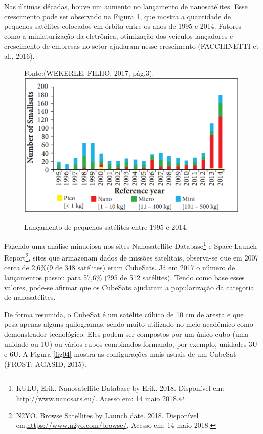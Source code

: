Nas últimas décadas, houve um aumento no lançamento de nanosatélites. Esse crescimento pode ser observado na Figura \ref{fig03}, que mostra a quantidade de pequenos satélites colocados em órbita entre os anos de 1995 e 2014. Fatores como a miniaturização da eletrônica, otimização dos veículos lançadores e crescimento de empresas no setor ajudaram nesse crescimento (FACCHINETTI et al., 2016).

{\small
	\begin{figure}[h]
		\centering
		Fonte:(WEKERLE; FILHO, 2017, pág.3).
		\includegraphics[keepaspectratio=true,scale=0.55]{figuras/lancamentoPequenoSatellite.PNG}
		\caption{Lançamento de pequenos satélites entre 1995 e 2014.}
		\label{fig03}
	\end{figure}
}

Fazendo uma análise minuciosa nos sites Nanosatellite Database\footnote{ KULU, Erik. Nanosatellite Database by Erik. 2018. Disponível em: \url{http://www.nanosats.eu/}. Acesso em: 14 maio 2018.} e Space Launch Report\footnote{N2YO. Browse Satellites by Launch date. 2018. Disponível em:\url{https://www.n2yo.com/browse/}.  Acesso em: 14 maio 2018.}, sites que armazenam dados de missões satelitais, observa-se que em 2007 cerca de 2,6\%(9 de 348 satélites) eram CubeSats. Já em 2017 o número de lançamentos passou para 57,6\% (295 de 512 satélites). Tendo como base esses valores, pode-se afirmar que os CubeSats ajudaram a popularização da categoria de nanosatélites.

De forma resumida, o CubeSat é um satélite cúbico de 10 cm de aresta e que pesa apenas alguns quilogramas, sendo muito utilizado no meio acadêmico como demonstrador tecnológico. Eles podem ser compostos por um único cubo (uma unidade ou 1U) ou vários cubos combinados formando, por exemplo, unidades 3U e 6U. A Figura \ref{fig04} mostra as configurações mais usuais de um CubeSat (FROST; AGASID, 2015).

